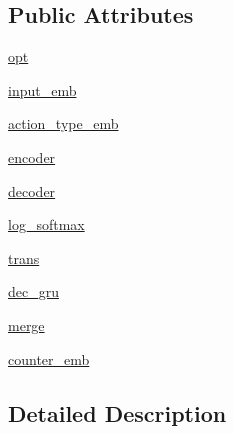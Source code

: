 \subsection*{Public Attributes}
\begin{DoxyCompactItemize}
\item 
\hyperlink{classprojects_1_1mastering__the__dungeon_1_1agents_1_1graph__world2_1_1models_1_1ObjectChecklistModel_acbc8185ff15b08c9a0c1040a461ef9eb}{opt}
\item 
\hyperlink{classprojects_1_1mastering__the__dungeon_1_1agents_1_1graph__world2_1_1models_1_1ObjectChecklistModel_a075f12669205489b954a6838e29c3e94}{input\+\_\+emb}
\item 
\hyperlink{classprojects_1_1mastering__the__dungeon_1_1agents_1_1graph__world2_1_1models_1_1ObjectChecklistModel_a0d26203b56b4baf2a8a3525118593771}{action\+\_\+type\+\_\+emb}
\item 
\hyperlink{classprojects_1_1mastering__the__dungeon_1_1agents_1_1graph__world2_1_1models_1_1ObjectChecklistModel_a34e1c2e9a1d274b3fb98873aa94464da}{encoder}
\item 
\hyperlink{classprojects_1_1mastering__the__dungeon_1_1agents_1_1graph__world2_1_1models_1_1ObjectChecklistModel_a462acc5200deb2bf81b3b6983eb8403c}{decoder}
\item 
\hyperlink{classprojects_1_1mastering__the__dungeon_1_1agents_1_1graph__world2_1_1models_1_1ObjectChecklistModel_ac8c8129b0a79f8fed531ec905362741d}{log\+\_\+softmax}
\item 
\hyperlink{classprojects_1_1mastering__the__dungeon_1_1agents_1_1graph__world2_1_1models_1_1ObjectChecklistModel_a94e7da3c37ddc0135e49dc1d823cab46}{trans}
\item 
\hyperlink{classprojects_1_1mastering__the__dungeon_1_1agents_1_1graph__world2_1_1models_1_1ObjectChecklistModel_a3678bbbbb9dc763331136a1f5dc34f26}{dec\+\_\+gru}
\item 
\hyperlink{classprojects_1_1mastering__the__dungeon_1_1agents_1_1graph__world2_1_1models_1_1ObjectChecklistModel_a5041915ae14e8731ba4a81af53623fdb}{merge}
\item 
\hyperlink{classprojects_1_1mastering__the__dungeon_1_1agents_1_1graph__world2_1_1models_1_1ObjectChecklistModel_a123118c2bff6e01d3b75eb503f2d5a8e}{counter\+\_\+emb}
\end{DoxyCompactItemize}


\subsection{Detailed Description}


